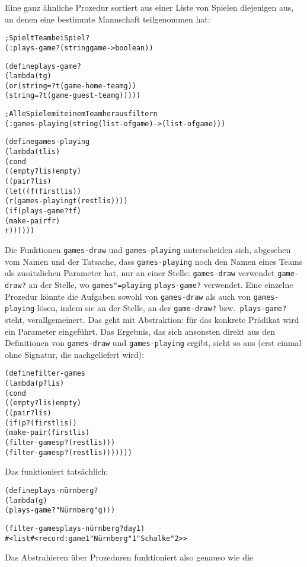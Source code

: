 Eine ganz ähnliche Prozedur sortiert aus einer Liste von Spielen diejenigen
aus, an denen eine bestimmte Mannschaft teilgenommen hat:
%
\begin{alltt}
; Spielt Team bei Spiel?
(: plays-game? (string game -> boolean))

(define plays-game?
  (lambda (t g)
    (or (string=? t (game-home-team g))
        (string=? t (game-guest-team g)))))

; Alle Spiele mit einem Team herausfiltern
(: games-playing (string (list-of game) -> (list-of game)))

(define games-playing
  (lambda (t lis)
    (cond
      ((empty? lis) empty)
      ((pair? lis)
       (let ((f (first lis))
             (r (games-playing t (rest lis))))
         (if (plays-game? t f)
             (make-pair f r)
             r))))))
\end{alltt}
%
Die Funktionen \texttt{games-draw} und \texttt{games-playing} unterscheiden
sich, abgesehen vom Namen und der Tatsache, dass \texttt{games-playing} noch
den Namen eines Teams als zusätzlichen Parameter hat, nur an
einer Stelle: \texttt{games-draw} verwendet
\texttt{game-draw?} an der Stelle, wo \texttt{games"=playing} 
\texttt{plays-game?} verwendet.  Eine einzelne Prozedur könnte die
Aufgaben sowohl von \texttt{games-draw} als auch von \texttt{games-playing}
lösen, indem sie an der Stelle, an der \texttt{game-draw?}
bzw.\ \texttt{plays-game?} steht, verallgemeinert.  Das geht mit
Abstraktion: für das konkrete Prädikat wird ein
Parameter eingeführt.  Das Ergebnis, das sich ansonsten
direkt aus den Definitionen von \texttt{games-draw} und
\texttt{games-playing} ergibt, sieht so aus (erst einmal ohne
Signatur, die nachgeliefert wird):
%
\begin{alltt}
(define filter-games
  (lambda (p? lis)
    (cond
      ((empty? lis) empty)
      ((pair? lis)
       (if (p? (first lis))
           (make-pair (first lis)
                      (filter-games p? (rest lis)))
           (filter-games p? (rest lis)))))))
\end{alltt}
%
Das funktioniert tatsächlich:
%
\begin{alltt}
(define plays-nürnberg?
   (lambda (g)
      (plays-game? "Nürnberg" g)))

(filter-games plays-nürnberg? day1)
\evalsto{} #<list #<record:game 1 "Nürnberg" 1 "Schalke" 2>>
\end{alltt}
%
Das Abstrahieren über Prozeduren funktioniert also genauso wie die
